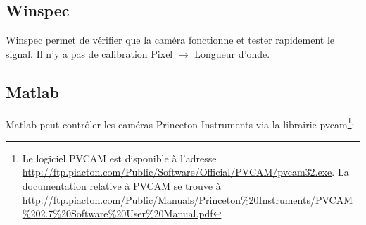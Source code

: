 \documentclass[11pt,francais]{book} %
\begin{document}
\subsection{Winspec}

Winspec permet de vérifier que la caméra fonctionne et tester rapidement le signal.
Il n'y a pas de calibration Pixel $\rightarrow$ Longueur d'onde.

\subsection{Matlab}

Matlab peut contrôler les caméras Princeton Instruments via la librairie pvcam\footnote{Le logiciel PVCAM est disponible à l'adresse \url{http://ftp.piacton.com/Public/Software/Official/PVCAM/pvcam32.exe}. La documentation relative à PVCAM se trouve à \url{http://ftp.piacton.com/Public/Manuals/Princeton\%20Instruments/PVCAM\%202.7\%20Software\%20User\%20Manual.pdf}}:
\begin{center}
\end{center}

\end{document}
